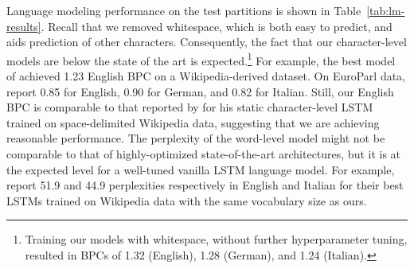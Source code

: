 Language modeling performance on the test partitions is shown in
Table~\ref{tab:lm-results}. Recall that we removed whitespace, which
is both easy to predict, and aids prediction of other
characters. Consequently, the fact that our character-level models are
below the state of the art is expected.\footnote{Training our models
  with whitespace, without further hyperparameter tuning, resulted in
  BPCs of 1.32 (English), 1.28 (German), and 1.24 (Italian).}
For example, the best model of  achieved
1.23 English BPC on a Wikipedia-derived dataset. %
On EuroParl data,  report 0.85 for English,
0.90 for German, and 0.82 for Italian. Still, our English BPC is
comparable to that reported by  for his static
character-level LSTM trained on space-delimited Wikipedia data,
suggesting that we are achieving reasonable performance.
The perplexity of the word-level model might not be comparable to
that of highly-optimized state-of-the-art architectures, but it is at the
expected level for a well-tuned vanilla LSTM language model. For
example,  report 51.9 and 44.9 perplexities respectively in English and Italian for
their best LSTMs trained on Wikipedia data with the same vocabulary
size as ours.

